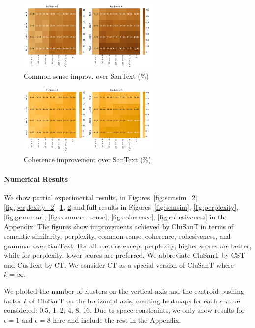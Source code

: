 \documentclass[11pt]{article}
\newcommand{\clusant}{CluSanT\xspace}
\begin{document}
\begin{figure}[ht]
    \centering
    \includegraphics[width=7cm]{latex/fig/heatmap_common_sense_2.pdf}
    \caption{Common sense improv. over SanText (\%)}
    \label{fig:common_sense_2}
\end{figure}


\begin{figure}
    \centering
    \includegraphics[width=7cm]{latex/fig/heatmap_coherence_2.pdf}
    \caption{Coherence improvement over SanText (\%)}
    \label{fig:coherence_2}
\end{figure}










\paragraph{Numerical Results}
We show partial experimental results, in Figures~\ref{fig:semsim_2}, \ref{fig:perplexity_2}, \ref{fig:common_sense_2}, \ref{fig:coherence_2} 
and full results in Figures~\ref{fig:semsim}, \ref{fig:perplexity}, \ref{fig:grammar}, \ref{fig:common_sense}, \ref{fig:coherence}, \ref{fig:cohesiveness} in the Appendix. 
The figures show improvements achieved by \clusant in terms of semantic similarity, perplexity, common sense, coherence, cohesiveness, and grammar over SanText. 
For all metrics except perplexity, higher scores are better, while for perplexity, lower scores are preferred.
We abbreviate \clusant by CST and CusText by CT. 
We consider CT as a special version of \clusant where $k=\infty$.

We plotted the number of clusters on the vertical axis and the centroid pushing factor $k$ of \clusant on the horizontal axis, creating heatmaps for each $\epsilon$ value considered: 0.5, 1, 2, 4, 8, 16. Due to space constraints, we only show results for $\epsilon=1$ and $\epsilon=8$ here and include the rest in the Appendix. 
\end{document}
